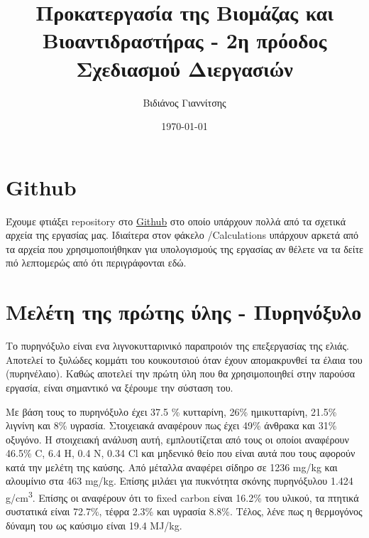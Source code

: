 \documentclass[11pt]{article}
\author{Βιδιάνος Γιαννίτσης}
\date{\today}
\title{Προκατεργασία της Βιομάζας και Βιοαντιδραστήρας - 2η πρόοδος Σχεδιασμού Διεργασιών}
\begin{document}
\maketitle
\tableofcontents

\renewcommand{\abstractname}{Περίληψη}
\renewcommand{\tablename}{Πίνακας}
\renewcommand{\figurename}{Σχήμα}
\renewcommand\listingscaption{Κώδικας}

\section{Github}
\label{sec:orgf2d83e3}
Έχουμε φτιάξει repository στο \href{https://github.com/Vidianos-Giannitsis/Process-Design}{Github} στο οποίο υπάρχουν πολλά από τα σχετικά αρχεία της εργασίας μας. Ιδιαίτερα στον φάκελο /Calculations υπάρχουν αρκετά από τα αρχεία που χρησιμοποιήθηκαν για υπολογισμούς της εργασίας αν θέλετε να τα δείτε πιό λεπτομερώς από ότι περιγράφονται εδώ.

\pagebreak
\section{Μελέτη της πρώτης ύλης - Πυρηνόξυλο}
\label{sec:orge0bd9ce}
Το πυρηνόξυλο είναι ενα λιγνοκυτταρινικό παραπροιόν της επεξεργασίας της ελιάς. Αποτελεί το ξυλώδες κομμάτι του κουκουτσιού όταν έχουν απομακρυνθεί τα έλαια του (πυρηνέλαιο). Καθώς αποτελεί την πρώτη ύλη που θα χρησιμοποιηθεί στην παρούσα εργασία, είναι σημαντικό να ξέρουμε την σύσταση του.

Με βάση τους \cite{koutsomitopoulouPreparationCharacterizationOlive2014} το πυρηνόξυλο έχει 37.5 \% κυτταρίνη, 26\% ημικυτταρίνη, 21.5\% λιγνίνη και 8\% υγρασία. Στοιχειακά αναφέρουν πως έχει 49\% άνθρακα και 31\% οξυγόνο. Η στοιχειακή ανάλυση αυτή, εμπλουτίζεται από τους \cite{gonzalezCombustionOptimisationBiomass2004} οι οποίοι αναφέρουν 46.5\% C, 6.4 Η, 0.4 Ν, 0.34 Cl και μηδενικό θείο που είναι αυτά που τους αφορούν κατά την μελέτη της καύσης. Από μέταλλα αναφέρει σίδηρο σε 1236 mg/kg και αλουμίνιο στα 463 mg/kg. Επίσης μιλάει για πυκνότητα σκόνης πυρηνόξυλου 1.424 g/cm\textsuperscript{3}. Επίσης οι \cite{gonzalezCombustionOptimisationBiomass2004} αναφέρουν ότι το fixed carbon είναι 16.2\% του υλικού, τα πτητικά συστατικά είναι 72.7\%, τέφρα 2.3\% και υγρασία 8.8\%. Τέλος, λένε πως η θερμογόνος δύναμη του ως καύσιμο είναι 19.4 MJ/kg.
\end{document}
